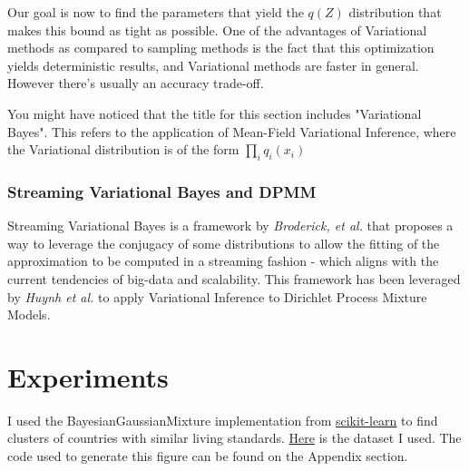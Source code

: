 \documentclass[11pt]{article}
\begin{document}
Our goal is now to find the parameters that yield the \(q(Z)\)
distribution that makes this bound as tight as possible. One of the
advantages of Variational methods as compared to sampling methods is the
fact that this optimization yields deterministic results, and
Variational methods are faster in general. However there's usually an
accuracy trade-off.
	
You might have noticed that the title for this section includes
"Variational Bayes". This refers to the application of Mean-Field
Variational Inference, where the Variational distribution is of the form
\(\prod_i q_i(x_i)\)
	
\subsubsection{Streaming Variational Bayes and DPMM}\label{streaming-variational-bayes-and-dpmm}
	
Streaming Variational Bayes is a framework by \emph{Broderick, et al.}
that proposes a way to leverage the conjugacy of some distributions to
allow the fitting of the approximation to be computed in a streaming
fashion - which aligns with the current tendencies of big-data and
scalability. This framework has been leveraged by \emph{Huynh et al.} to
apply Variational Inference to Dirichlet Process Mixture Models.
	
	
\section{Experiments}\label{experiments}

I used the BayesianGaussianMixture implementation from
\href{scikit-learn.org}{scikit-learn} to find clusters of countries with
similar living standards.
\href{http://www.sharecsv.com/s/4165c9b03d9fffdef43a3226613ff37c/Countries.csv}{Here}
is the dataset I used. The code used to generate this figure can be found on the Appendix section.
\end{document}

